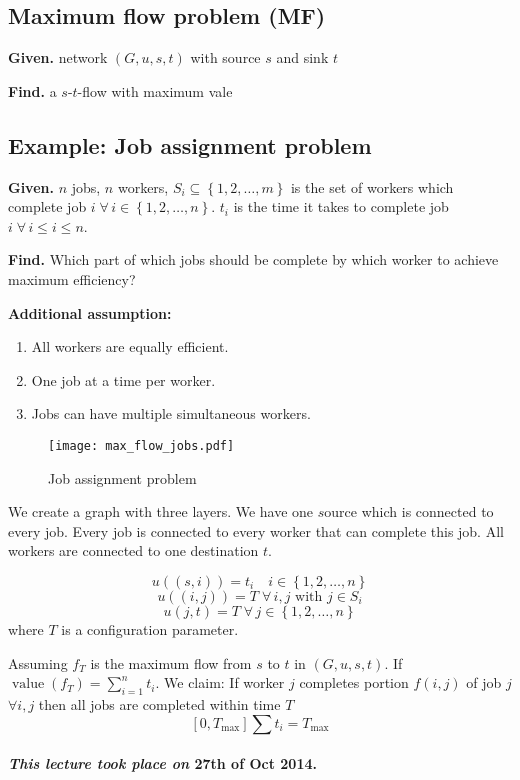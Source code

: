 \documentclass{article}
\newcommand{\set}[1]{\left\{#1\right\}}
\newcommand{\given}[1]{\textbf{Given.} #1\par}
\newcommand{\find}[1]{\textbf{Find.} #1\par}
\newcommand{\dateref}[1]{\paragraph{\textit{This lecture took place on} #1.}}
\newcommand{\flow}[2]{$#1$-$#2$-flow}
\newcommand{\fall}{\;\forall\,}
\begin{document}
\subsection{Maximum flow problem (MF)}
%
\given{network $(G, u, s, t)$ with source $s$ and sink $t$}
\find{a \flow st with maximum vale}

\subsection{Example: Job assignment problem}
%
\given{$n$ jobs, $n$ workers, $S_i \subseteq \set{1, 2, \ldots, m}$ is the set of workers which complete job $i \fall i \in \set{1, 2, \ldots, n}$. $t_i$ is the time it takes to complete job $i \fall i \leq i \leq n$. }
\find{Which part of which jobs should be complete by which worker to achieve maximum efficiency?}

\textbf{Additional assumption:}
\begin{enumerate}
  \item All workers are equally efficient.
  \item One job at a time per worker.
  \item Jobs can have multiple simultaneous workers.
\end{enumerate}

 \begin{figure}[h]
  \begin{center}
   \texttt{[image: max\_flow\_jobs.pdf]}
   \caption{Job assignment problem}
  \end{center}
 \end{figure}

We create a graph with three layers. We have one $s$ource which is connected to every job. Every job is connected to every worker that can complete this job. All workers are connected to one destination $t$.

\[
  u((s, i)) = t_i  \quad i \in \set{1, 2, \ldots, n}
\] \[
  u((i, j)) = T \fall i, j \text{ with } j \in S_i
\] \[
  u(j, t) = T \fall j \in \set{1, 2, \ldots, n}
\]
where $T$ is a configuration parameter.

Assuming $f_T$ is the maximum flow from $s$ to $t$ in $(G, u, s, t)$. If $\operatorname{value}(f_T) = \sum_{i=1}^n t_i$. We claim: If worker $j$ completes portion $f(i, j)$ of job $j$ $\forall i, j$ then all jobs are completed within time $T$
\[
  [0, T_\text{max}] \sum t_i = T_\text{max}
\]

\dateref{27th of Oct 2014}
\end{document}
